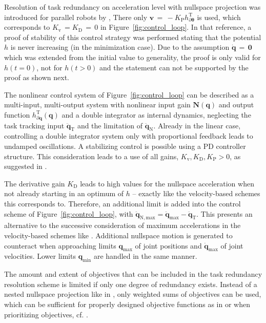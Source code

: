\documentclass[a4paper,twoside]{article}
\newcommand{\transp}[0]{{\mathrm{T}}}
\begin{document}
Resolution of task redundancy on acceleration level with nullspace projection was introduced for parallel robots by \cite{AgarwalNasBan2016},
There only $\bm{v}\,{=}\,{-}K_\mathrm{P} h_{\partial \bm{\theta}}^\transp$ is used, which corresponds to $K_\mathrm{v}\,{=}K_\mathrm{D}\,{=}\,0$ in Figure~\ref{fig:control_loop}.
In that reference, a proof of stability of this control strategy was performed stating that the potential $h$ is never increasing (in the minimization case).
Due to the assumption $\dot{\bm{q}}\,{=}\,\bm{0}$ which was extended from the initial value to generality, the proof is only valid for $h(t{=}0)$, not for $h(t{>}0)$ and the statement can not be supported by the proof as shown next.

The nonlinear control system of Figure~\ref{fig:control_loop} can be described as a multi-input, multi-output system with nonlinear input gain $\bm{N}(\bm{q})$ and output function $h_{\partial \bm{q}}^\transp(\bm{q})$ and a double integrator as internal dynamics, neglecting the task tracking input $\ddot{\bm{q}}_\mathrm{T}$ and the limitation of $\ddot{\bm{q}}_\mathrm{N}$.
Already in the linear case, controlling a double integrator system only with proportional feedback leads to undamped oscillations.
A stabilizing control is possible using a PD controller structure.
This consideration leads to a use of all gains, $K_\mathrm{v}, K_\mathrm{D},K_\mathrm{P}>0$, as suggested in \cite{DeLucaOriSic1992}.


The derivative gain $K_\mathrm{D}$ leads to high values for the nullspace acceleration when not already starting in an optimum of $h$ -- exactly like the velocity-based schemes this corresponds to.
Therefore, an additional limit is added into the control scheme of Figure~\ref{fig:control_loop}, with $\ddot{\bm{q}}_\mathrm{N,max}=\ddot{\bm{q}}_\mathrm{max}-\ddot{\bm{q}}_\mathrm{T}$.
This presents an alternative to the successive consideration of maximum accelerations in the velocity-based schemes like \cite{SantosSil2017}.
%
Additional nullspace motion is generated to counteract when approaching limits $\bm{q}_\mathrm{max}$ of joint positions and $\dot{\bm{q}}_\mathrm{max}$ of joint velocities.
Lower limits $\bm{q}_\mathrm{min}$ are handled in the same manner.

The amount and extent of objectives that can be included in the task redundancy resolution scheme is limited if only one degree of redundancy exists.
Instead of a nested nullspace projection like in \cite{NakamuraHanYos1987}, only weighted sums of objectives can be used, which can be sufficient for properly designed objective functions as in \cite{ZhuQuCaoYan2013} or when prioritizing objectives, cf. \cite{LilloChiAnt2019}.
\end{document}
